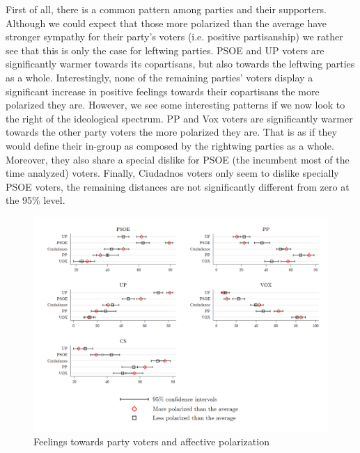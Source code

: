 \documentclass[a4paper, svgnames]{article}
\begin{document}
First of all, there is a common pattern among parties and their supporters. Although we could expect that those more polarized than the average have stronger sympathy for their party's voters (i.e. positive partisanship) we rather see that this is only the case for leftwing parties. PSOE and UP voters are significantly warmer towards its copartisans, but also towards the leftwing parties as a whole. Interestingly, none of the remaining parties' voters display a significant increase in positive feelings towards their copartisans the more polarized they are. However, we see some interesting patterns if we now look to the right of the ideological spectrum. PP and Vox voters are significantly warmer towards the other party voters the more polarized they are. That is as if they would define their in-group as composed by the rightwing parties as a whole. Moreover, they also share a special dislike for PSOE (the incumbent most of the time analyzed) voters. Finally, Ciudadnos voters only seem to dislike specially PSOE voters, the remaining distances are not significantly different from zero at the 95\% level.

\begin{figure}[H]
	\centering
	\includegraphics[scale=0.35]{Figures/combinedfeelingsAP.png}
	\caption{\label{fig:feelings} Feelings towards party voters and affective polarization}
\end{figure}
\end{document}
